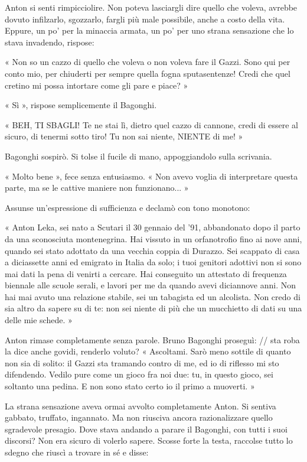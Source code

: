 Anton si senti rimpicciolire. Non poteva lasciargli dire quello che voleva, avrebbe dovuto infilzarlo, sgozzarlo, fargli più male possibile, anche a costo della vita. Eppure, un po' per la minaccia armata, un po' per uno strana sensazione che lo stava invadendo, rispose:

« Non so un cazzo di quello che voleva o non voleva fare il Gazzi. Sono qui per conto mio, per chiuderti per sempre quella fogna sputasentenze! Credi che quel cretino mi possa intortare come gli pare e piace? »

« Sì », rispose semplicemente il Bagonghi.

« BEH, TI SBAGLI! Te ne stai lì, dietro quel cazzo di cannone, credi di essere al sicuro, di tenermi sotto tiro! Tu non sai niente, NIENTE di me! »

Bagonghi sospirò. Si tolse il fucile di mano, appoggiandolo sulla scrivania.

« Molto bene », fece senza entusiasmo. « Non avevo voglia di interpretare questa parte, ma se le cattive maniere non funzionano... »

Assunse un'espressione di sufficienza e declamò con tono monotono:

« Anton Leka, sei nato a Scutari il 30 gennaio del '91, abbandonato dopo il parto da una sconosciuta montenegrina. Hai vissuto in un orfanotrofio fino ai nove anni, quando sei stato adottato da una vecchia coppia di Durazzo. Sei scappato di casa a diciassette anni ed emigrato in Italia da solo; i tuoi genitori adottivi non si sono mai dati la pena di venirti a cercare. Hai conseguito un attestato di frequenza biennale alle scuole serali, e lavori per me da quando avevi diciannove anni. Non hai mai avuto una relazione stabile, sei un tabagista ed un alcolista. Non credo di sia altro da sapere su di te: non sei niente di più che un mucchietto di dati su una delle mie schede. »

Anton rimase completamente senza parole. Bruno Bagonghi proseguì:
// sta roba la dice anche govidi, renderlo voluto?
« Ascoltami. Sarò meno sottile di quanto non sia di solito: il Gazzi sta tramando contro di me, ed io di riflesso mi sto difendendo. Vedilo pure come un gioco fra noi due: tu, in questo gioco, sei soltanto una pedina. E non sono stato certo io il primo a muoverti. »

La strana sensazione aveva ormai avvolto completamente Anton. Si sentiva gabbato, truffato, ingannato. Ma non riusciva ancora razionalizzare quello sgradevole presagio. Dove stava andando a parare il Bagonghi, con tutti i suoi discorsi? Non era sicuro di volerlo sapere. Scosse forte la testa, raccolse tutto lo sdegno che riuscì a trovare in sé e disse:

